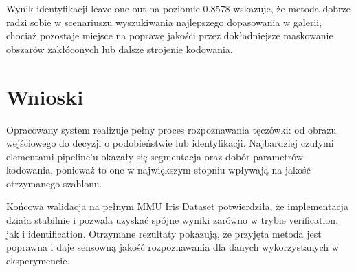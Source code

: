 \documentclass[12pt,a4paper]{article}
\begin{document}
Wynik identyfikacji leave-one-out na poziomie 0.8578 wskazuje, \.ze metoda dobrze radzi sobie w scenariuszu wyszukiwania najlepszego dopasowania w galerii, chocia\.z pozostaje miejsce na popraw\k{e} jako\'sci przez dok{\l}adniejsze maskowanie obszar\'ow zak{\l}\'oconych lub dalsze strojenie kodowania.

\section{Wnioski}
Opracowany system realizuje pe{\l}ny proces rozpoznawania t\k{e}cz\'owki: od obrazu wej\'sciowego do decyzji o podobie\'nstwie lub identyfikacji. Najbardziej czu{\l}ymi elementami pipeline'u okaza{\l}y si\k{e} segmentacja oraz dob\'or parametr\'ow kodowania, poniewa\.z to one w najwi\k{e}kszym stopniu wp{\l}ywaj\k{a} na jako\'s\'c otrzymanego szablonu.

Ko\'ncowa walidacja na pe{\l}nym MMU Iris Dataset potwierdzi{\l}a, \.ze implementacja dzia{\l}a stabilnie i pozwala uzyska\'c sp\'ojne wyniki zar\'owno w trybie verification, jak i identification. Otrzymane rezultaty pokazuj\k{a}, \.ze przyj\k{e}ta metoda jest poprawna i daje sensown\k{a} jako\'s\'c rozpoznawania dla danych wykorzystanych w eksperymencie.
\end{document}
